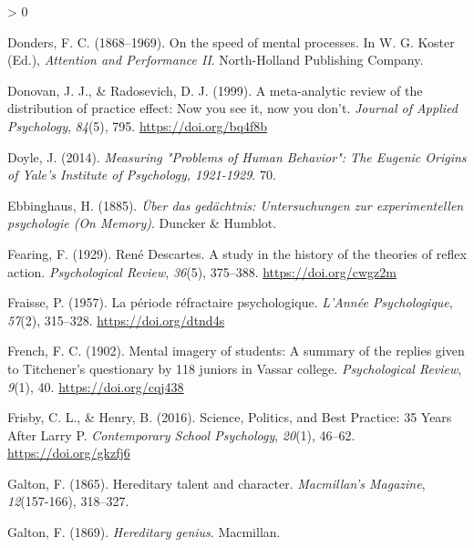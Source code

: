 \documentclass[
  oneside,
  12pt]{crumpbook}
\newlength{\cslhangindent}
\newenvironment{CSLReferences}[2] %
 {%
  \setlength{\parindent}{0pt}
  \ifodd #1 \everypar{\setlength{\hangindent}{\cslhangindent}}\ignorespaces\fi
  \ifnum #2 > 0
  \setlength{\parskip}{#2\baselineskip}
  \fi
 }%
 {}
\begin{document}
\begin{CSLReferences}{1}{0}
\leavevmode\hypertarget{ref-dondersSpeedMentalProcesses1868}{}%
Donders, F. C. (1868--1969). On the speed of mental processes. In W. G. Koster (Ed.), \emph{Attention and {Performance II}}. {North-Holland Publishing Company}.

\leavevmode\hypertarget{ref-donovanMetaanalyticReviewDistribution1999}{}%
Donovan, J. J., \& Radosevich, D. J. (1999). A meta-analytic review of the distribution of practice effect: {Now} you see it, now you don't. \emph{Journal of Applied Psychology}, \emph{84}(5), 795. \url{https://doi.org/bq4f8b}

\leavevmode\hypertarget{ref-doyleMeasuringProblemsHuman2014}{}%
Doyle, J. (2014). \emph{Measuring "{Problems} of {Human Behavior}": {The Eugenic Origins} of {Yale}'s {Institute} of {Psychology}, 1921-1929}. 70.

\leavevmode\hypertarget{ref-ebbinghausUberGedachtnisUntersuchungen1885}{}%
Ebbinghaus, H. (1885). \emph{Über das gedächtnis: Untersuchungen zur experimentellen psychologie ({On Memory})}. {Duncker \& Humblot}.

\leavevmode\hypertarget{ref-fearingReneDescartesStudy1929}{}%
Fearing, F. (1929). René {Descartes}. {A} study in the history of the theories of reflex action. \emph{Psychological Review}, \emph{36}(5), 375--388. \url{https://doi.org/cwgz2m}

\leavevmode\hypertarget{ref-fraissePeriodeRefractairePsychologique1957}{}%
Fraisse, P. (1957). La période réfractaire psychologique. \emph{L'Année Psychologique}, \emph{57}(2), 315--328. \url{https://doi.org/dtnd4s}

\leavevmode\hypertarget{ref-frenchMentalImageryStudents1902}{}%
French, F. C. (1902). Mental imagery of students: {A} summary of the replies given to {Titchener}'s questionary by 118 juniors in {Vassar} college. \emph{Psychological Review}, \emph{9}(1), 40. \url{https://doi.org/cqj438}

\leavevmode\hypertarget{ref-frisbySciencePoliticsBest2016}{}%
Frisby, C. L., \& Henry, B. (2016). Science, {Politics}, and {Best Practice}: 35 {Years After Larry P}. \emph{Contemporary School Psychology}, \emph{20}(1), 46--62. \url{https://doi.org/gkzfj6}

\leavevmode\hypertarget{ref-galtonHereditaryTalentCharacter1865}{}%
Galton, F. (1865). Hereditary talent and character. \emph{Macmillan's Magazine}, \emph{12}(157-166), 318--327.

\leavevmode\hypertarget{ref-galtonHereditaryGenius1869}{}%
Galton, F. (1869). \emph{Hereditary genius}. {Macmillan}.


\end{CSLReferences}
\end{document}
